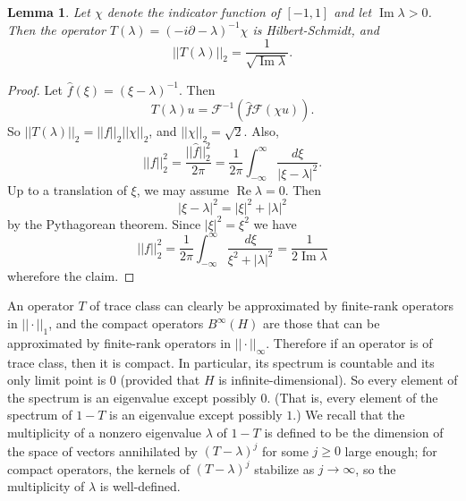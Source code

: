 \documentclass[12pt]{report}
\renewcommand{\Re}{\operatorname{Re}}
\renewcommand{\Im}{\operatorname{Im}}
\newtheorem{lemma}[theorem]{Lemma}
\theoremstyle{definition}
\begin{document}
\begin{lemma}
  \label{partial resolvent is hilbert schmidt}
Let $\chi$ denote the indicator function of $[-1, 1]$ and let $\Im \lambda > 0$. Then the operator $T(\lambda) = (-i\partial - \lambda)^{-1}\chi$ is Hilbert-Schmidt, and
$$||T(\lambda)||_2 = \frac{1}{\sqrt{\Im \lambda}}.$$
\end{lemma}
\begin{proof}
Let $\hat f(\xi) = (\xi - \lambda)^{-1}$. Then
$$T(\lambda)u = \mathcal F^{-1}(\hat f \mathcal F(\chi u)).$$
So $||T(\lambda)||_2 = ||f||_2||\chi||_2$, and $||\chi||_2 = \sqrt 2$. Also,
$$||f||_2^2 = \frac{||\hat f||_2^2}{2\pi} = \frac{1}{2\pi} \int_{-\infty}^\infty \frac{d\xi}{|\xi - \lambda|^2}.$$
Up to a translation of $\xi$, we may assume $\Re \lambda = 0$. Then
$$|\xi - \lambda|^2 = |\xi|^2 + |\lambda|^2$$
by the Pythagorean theorem. Since $|\xi|^2 = \xi^2$ we have
$$||f||_2^2 = \frac{1}{2\pi} \int_{-\infty}^\infty \frac{d\xi}{\xi^2 + |\lambda|^2} = \frac{1}{2\Im \lambda}$$
wherefore the claim.
\end{proof}

An operator $T$ of trace class can clearly be approximated by finite-rank operators in $||\cdot||_1$, and the compact operators $B^\infty(H)$ are those that can be approximated by finite-rank operators in $||\cdot||_\infty$. Therefore if an operator is of trace class, then it is compact.
In particular, its spectrum is countable and its only limit point is $0$ (provided that $H$ is infinite-dimensional). So every element of the spectrum is an eigenvalue except possibly $0$. (That is, every element of the spectrum of $1 - T$ is an eigenvalue except possibly $1$.) We recall that the multiplicity of a nonzero eigenvalue $\lambda$ of $1 - T$ is defined to be the dimension of the space of vectors annihilated by $(T - \lambda)^j$ for some $j \geq 0$ large enough; for compact operators, the kernels of $(T - \lambda)^j$ stabilize as $j \to \infty$, so the multiplicity of $\lambda$ is well-defined.
\end{document}
